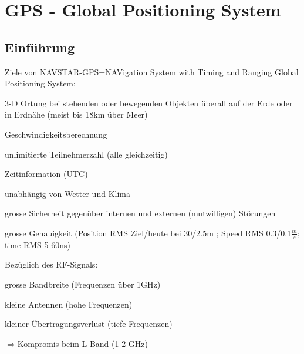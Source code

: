 \section{GPS - Global Positioning System }
\subsection{Einführung}  
        Ziele von NAVSTAR-GPS=NAVigation System with Timing and Ranging Global
        Positioning System:
        
    \begin{minipage}{12.3cm}	  
        \begin{liste}
            \item 3-D Ortung bei stehenden oder bewegenden Objekten überall auf der
            Erde oder in Erdnähe (meist bis 18km über Meer)
            \item Geschwindigkeitsberechnung
            \item unlimitierte Teilnehmerzahl (alle gleichzeitig)
            \item Zeitinformation (UTC)
            \item unabhängig von Wetter und Klima
            \item grosse Sicherheit gegenüber internen und externen (mutwilligen)
            Störungen
            \item grosse Genauigkeit (Position RMS Ziel/heute bei 30/2.5m ; Speed RMS
            0.3/0.1$\frac{m}{s}$; time RMS 5-60ns)    
        \end{liste}
		Bezüglich des RF-Signals:
		\begin{liste}
	    	\item grosse Bandbreite (Frequenzen über 1GHz)
	    	\item kleine Antennen (hohe Frequenzen)
	    	\item kleiner Übertragungsverlust (tiefe Frequenzen)    
	    \end{liste}
		$\Rightarrow$Kompromis beim L-Band (1-2 GHz)		
    \end{minipage}
